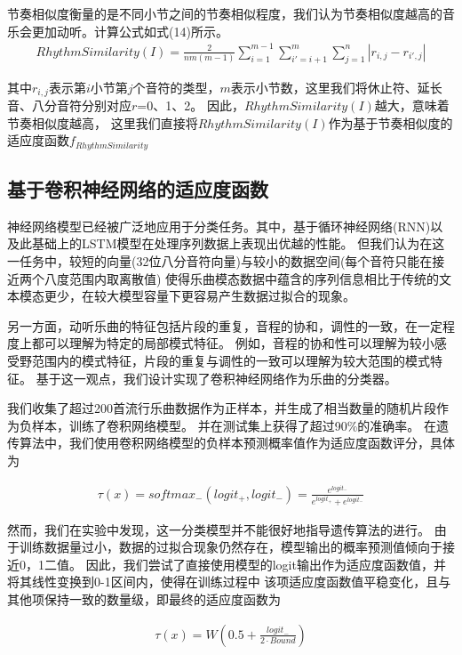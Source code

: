 \documentclass{article}
\begin{document}
节奏相似度衡量的是不同小节之间的节奏相似程度，我们认为节奏相似度越高的音乐会更加动听。计算公式如式(14)所示。
\begin{align}
    RhythmSimilarity(I) = \frac{2}{nm(m-1)}\sum_{i=1}^{m-1} \sum_{i'=i+1}^{m} \sum_{j=1}^{n} |r_{i,j}-r_{i',j}|
\end{align}

其中$r_{i,j}$表示第$i$小节第$j$个音符的类型，$m$表示小节数，这里我们将休止符、延长音、八分音符分别对应$r$=0、1、2。
因此，$RhythmSimilarity(I)$越大，意味着节奏相似度越高，
这里我们直接将$RhythmSimilarity(I)$作为基于节奏相似度的适应度函数$f_{RhythmSimilarity}$

\subsection{基于卷积神经网络的适应度函数}
神经网络模型已经被广泛地应用于分类任务。其中，基于循环神经网络(RNN)以及此基础上的LSTM模型在处理序列数据上表现出优越的性能。
但我们认为在这一任务中，较短的向量(32位八分音符向量)与较小的数据空间(每个音符只能在接近两个八度范围内取离散值)
使得乐曲模态数据中蕴含的序列信息相比于传统的文本模态更少，在较大模型容量下更容易产生数据过拟合的现象。

另一方面，动听乐曲的特征包括片段的重复，音程的协和，调性的一致，在一定程度上都可以理解为特定的局部模式特征。
例如，音程的协和性可以理解为较小感受野范围内的模式特征，片段的重复与调性的一致可以理解为较大范围的模式特征。
基于这一观点，我们设计实现了卷积神经网络作为乐曲的分类器。

我们收集了超过200首流行乐曲数据作为正样本，并生成了相当数量的随机片段作为负样本，训练了卷积网络模型。
并在测试集上获得了超过90\%的准确率。
在遗传算法中，我们使用卷积网络模型的负样本预测概率值作为适应度函数评分，具体为

\begin{align}
    \tau(x) = softmax_{-}(logit_{+}, logit_{-}) = \frac{e^{logit_{-}}}{e^{logit_{+}} + e^{logit_{-}}}
\end{align}

然而，我们在实验中发现，这一分类模型并不能很好地指导遗传算法的进行。
由于训练数据量过小，数据的过拟合现象仍然存在，模型输出的概率预测值倾向于接近0，1二值。
因此，我们尝试了直接使用模型的logit输出作为适应度函数值，并将其线性变换到0-1区间内，使得在训练过程中
该项适应度函数值平稳变化，且与其他项保持一致的数量级，即最终的适应度函数为

\begin{align}
    \tau(x) = W(0.5 + \frac{logit_{-}}{2 \cdot Bound})
\end{align}
\end{document}

